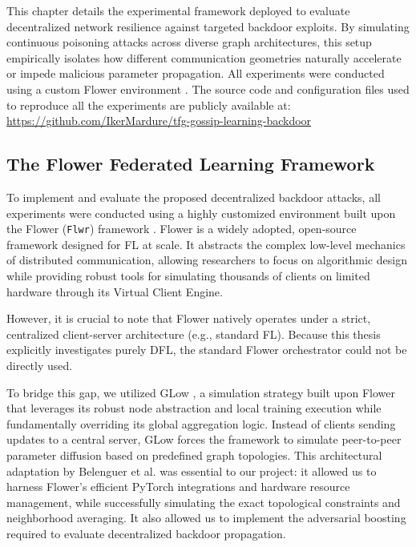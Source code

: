 This chapter details the experimental framework deployed to evaluate decentralized network resilience against targeted backdoor exploits. By simulating continuous poisoning attacks across diverse graph architectures, this setup empirically isolates how different communication geometries naturally accelerate or impede malicious parameter propagation. All experiments were conducted using a custom Flower environment \cite{beutel2020flower,belenguer2025glow}. The source code and configuration files used to reproduce all the experiments are publicly available at: \url{https://github.com/IkerMardure/tfg-gossip-learning-backdoor}

\subsection{The Flower Federated Learning Framework}
\label{sec:flower_framework}

To implement and evaluate the proposed decentralized backdoor attacks, all experiments were conducted using a highly customized environment built upon the Flower (\texttt{Flwr}) framework \cite{beutel2020flower}. Flower is a widely adopted, open-source framework designed for FL at scale. It abstracts the complex low-level mechanics of distributed communication, allowing researchers to focus on algorithmic design while providing robust tools for simulating thousands of clients on limited hardware through its Virtual Client Engine.

However, it is crucial to note that Flower natively operates under a strict, centralized client-server architecture (e.g., standard FL). Because this thesis explicitly investigates purely DFL, the standard Flower orchestrator could not be directly used. 

To bridge this gap, we utilized GLow \cite{belenguer2025glow}, a simulation strategy built upon Flower that leverages its robust node abstraction and local training execution while fundamentally overriding its global aggregation logic. Instead of clients sending updates to a central server, GLow forces the framework to simulate peer-to-peer parameter diffusion based on predefined graph topologies. This architectural adaptation by Belenguer et al. was essential to our project: it allowed us to harness Flower's efficient PyTorch integrations and hardware resource management, while successfully simulating the exact topological constraints and  neighborhood averaging. It also allowed us to implement the adversarial boosting required to evaluate decentralized backdoor propagation.

